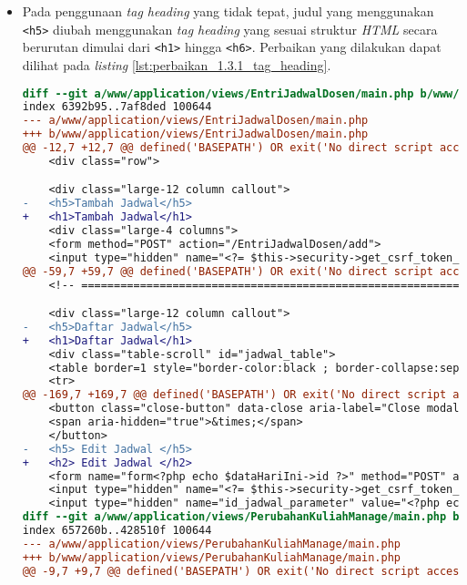 \begin{itemize}
\item Pada penggunaan \textit{tag heading} yang tidak tepat, judul yang menggunakan \texttt{<h5>} diubah menggunakan \textit{tag heading} yang sesuai struktur \textit{HTML} secara berurutan dimulai dari \texttt{<h1>} hingga \texttt{<h6>}. Perbaikan yang dilakukan dapat dilihat pada \textit{listing} \ref{lst:perbaikan_1.3.1_tag_heading}.
\begin{lstlisting}[frame=single, label={lst:perbaikan_1.3.1_tag_heading}, language=diff, caption=Perbaikan Kriteria Sukses 1.3.1 - Penggunaan \textit{Heading} Tidak Tepat]
diff --git a/www/application/views/EntriJadwalDosen/main.php b/www/application/views/EntriJadwalDosen/main.php
index 6392b95..7af8ded 100644
--- a/www/application/views/EntriJadwalDosen/main.php
+++ b/www/application/views/EntriJadwalDosen/main.php
@@ -12,7 +12,7 @@ defined('BASEPATH') OR exit('No direct script access allowed');
    <div class="row">

    <div class="large-12 column callout">
-   <h5>Tambah Jadwal</h5>
+   <h1>Tambah Jadwal</h1>
    <div class="large-4 columns">
    <form method="POST" action="/EntriJadwalDosen/add">
    <input type="hidden" name="<?= $this->security->get_csrf_token_name() ?>" value="<?= $this->security->get_csrf_hash() ?>" />
@@ -59,7 +59,7 @@ defined('BASEPATH') OR exit('No direct script access allowed');
    <!-- ===================================================================== Pembentukan Tabel ============================================================================= -->

    <div class="large-12 column callout">
-   <h5>Daftar Jadwal</h5>
+   <h1>Daftar Jadwal</h1>
    <div class="table-scroll" id="jadwal_table">
    <table border=1 style="border-color:black ; border-collapse:separate">
    <tr> 
@@ -169,7 +169,7 @@ defined('BASEPATH') OR exit('No direct script access allowed');
    <button class="close-button" data-close aria-label="Close modal" type="button">
    <span aria-hidden="true">&times;</span>
    </button>
-   <h5> Edit Jadwal </h5>
+   <h2> Edit Jadwal </h2>
    <form name="form<?php echo $dataHariIni->id ?>" method="POST" action="/EntriJadwalDosen/update/<?php echo $dataHariIni->id ?>">
    <input type="hidden" name="<?= $this->security->get_csrf_token_name() ?>" value="<?= $this->security->get_csrf_hash() ?>" />
    <input type="hidden" name="id_jadwal_parameter" value="<?php echo $dataHariIni->id ?>"> </a> <br>
diff --git a/www/application/views/PerubahanKuliahManage/main.php b/www/application/views/PerubahanKuliahManage/main.php
index 657260b..428510f 100644
--- a/www/application/views/PerubahanKuliahManage/main.php
+++ b/www/application/views/PerubahanKuliahManage/main.php
@@ -9,7 +9,7 @@ defined('BASEPATH') OR exit('No direct script access allowed');


\end{lstlisting}
\end{itemize}
